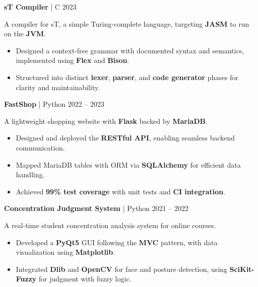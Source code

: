 \documentclass[11pt]{article}
\begin{document}
\vspace{6pt}

\textbf{sT Compiler} | C \hfill 2023

A compiler for sT, a simple Turing-complete language, targeting \textbf{JASM} to run on the \textbf{JVM}.
\begin{itemize}[noitemsep, topsep=0pt, partopsep=0pt, parsep=0pt, leftmargin=*]
    \item Designed a context-free grammar with documented syntax and semantics, implemented using \textbf{Flex} and \textbf{Bison}.
    \item Structured into distinct \textbf{lexer}, \textbf{parser}, and \textbf{code generator} phases for clarity and maintainability.
\end{itemize}

\vspace{6pt}

\textbf{FastShop} | Python \hfill 2022 – 2023

A lightweight shopping website with \textbf{Flask} backed by \textbf{MariaDB}.
\begin{itemize}[noitemsep, topsep=0pt, partopsep=0pt, parsep=0pt, leftmargin=*]
    \item Designed and deployed the \textbf{RESTful  API}, enabling seamless backend communication.
    \item Mapped MariaDB tables with ORM via \textbf{SQLAlchemy} for efficient data handling.
    \item Achieved \textbf{99\% test coverage} with unit tests and \textbf{CI integration}.
\end{itemize}

\vspace{6pt}

\textbf{Concentration Judgment System} | Python \hfill 2021 – 2022

A real-time student concentration analysis system for online courses.
\begin{itemize}[noitemsep, topsep=0pt, partopsep=0pt, parsep=0pt, leftmargin=*]
    \item Developed a \textbf{PyQt5} GUI following the \textbf{MVC} pattern, with data visualization using \textbf{Matplotlib}.
    \item Integrated \textbf{Dlib} and \textbf{OpenCV} for face and posture detection, using \textbf{SciKit-Fuzzy} for judgment with fuzzy logic.
\end{itemize}

\end{document}
